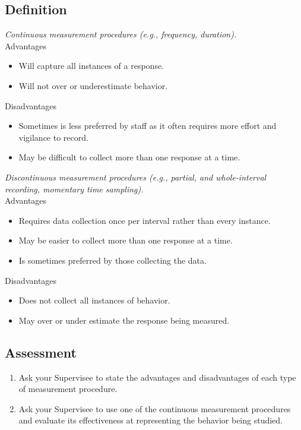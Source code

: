 \subsection{Definition}
\textit{Continuous measurement procedures (e.g., frequency, duration).}\\
Advantages
\begin{itemize}
\item Will capture all instances of a response.
\item Will not over or underestimate behavior.
\end{itemize}
Disadvantages
\begin{itemize}
\item Sometimes is less preferred by staff as it often requires more effort and vigilance to record.
\item May be difficult to collect more than one response at a time.
\end{itemize}
%
\textit{Discontinuous measurement procedures (e.g., partial, and whole-interval recording, momentary time sampling).}\\
Advantages
\begin{itemize}
\item Requires data collection once per interval rather than every instance.
\item May be easier to collect more than one response at a time.
\item Is sometimes preferred by those collecting the data.
\end{itemize}

Disadvantages
\begin{itemize}
\item Does not collect all instances of behavior.
\item May over or under estimate the response being measured.
\end{itemize}
%
\subsection{Assessment}
\begin{enumerate}
\item Ask your Supervisee to state the advantages and disadvantages of each type of measurement procedure. 
\item Ask your Supervisee to use one of the continuous measurement procedures and evaluate its effectiveness at representing the behavior being studied.
\end{enumerate}
%
